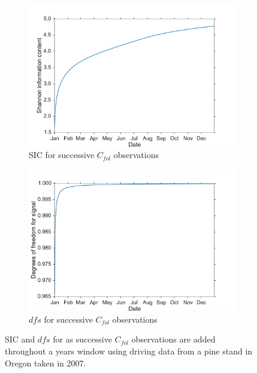 \documentclass[11pt]{article}
\begin{document}
\begin{figure}[ht]
    \centering
    \begin{subfigure}[b]{0.45\textwidth}
        \includegraphics[width=\textwidth]{sic_succ_cf.pdf}
        \caption{SIC for successive \(C_{fol}\) observations}
        \label{fig:sic_succ_cf}
    \end{subfigure}%
    \begin{subfigure}[b]{0.45\textwidth}
        \includegraphics[width=\textwidth]{dfs_succ_cf.pdf}
        \caption{\(dfs\) for successive \(C_{fol}\) observations}
        \label{fig:dfs_succ_cf}
    \end{subfigure}
    \caption{SIC and \(dfs\) for as successive \(C_{fol}\) observations are added throughout a years window using driving data from a pine stand in Oregon taken in 2007.}
    \label{fig:ic_succ_cf}
\end{figure}
\end{document}
